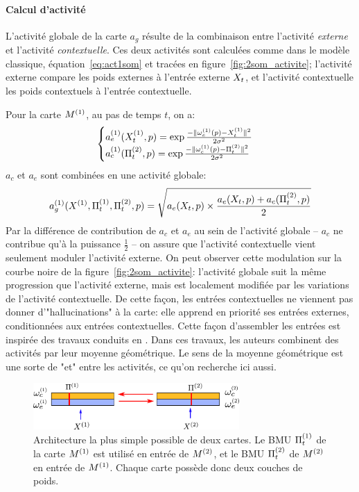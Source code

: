 \documentclass[../main]{subfiles}
\begin{document}
\paragraph{Calcul d'activité}
L'activité globale de la carte $a_g$ résulte de la combinaison entre l'activité \emph{externe} et l'activité \emph{contextuelle}. Ces deux activités sont calculées comme dans le modèle classique, équation~\ref{eq:act1som} et tracées en figure~\ref{fig:2som_activite}; l'activité externe compare les poids externes à l'entrée externe $X_t$, et l'activité contextuelle les poids contextuels à l'entrée contextuelle.

Pour la carte $M^{({1})}$, au pas de temps $t$, on a:
\begin{equation}
\label{eq:activite}
\begin{cases}
a_e^{({1})}(X_t^{({1})},p) = \exp\frac{-\lVert \omega_e^{({1})}(p)-X^{({1})}_t \rVert^2}{2\sigma^2} \\
a_c^{({1})}(\Pi^{({2})}_t,p) = \exp\frac{-\lVert \omega_c^{({1})}(p)-\Pi^{({2})}_t \rVert ^2}{2\sigma^2}\\
\end{cases}
\end{equation}
$a_c$ et $a_e$ sont combinées en une activité globale:
\begin{equation}
a_g^{({1})}(X^{({1})},\Pi^{({1})}_t,\Pi^{({2})}_t,p) = \sqrt{a_e(X_t,p)\times \frac{a_e(X_t,p) + a_c(\Pi^{({2})}_t,p)}{2}}
\end{equation}
Par la différence de contribution de $a_c$ et $a_e$ au sein de l'activité globale -- $a_c$ ne contribue qu'à la puissance $\frac{1}{2}$ -- on assure que l'activité contextuelle vient seulement moduler l'activité externe.
On peut observer cette modulation sur la courbe noire de la figure~\ref{fig:2som_activite}: l'activité globale suit la même progression que l'activité externe, mais est localement modifiée par les variations de l'activité contextuelle. De cette façon, les entrées contextuelles ne viennent pas donner d'"hallucinations" à la carte: elle apprend en priorité ses entrées externes, conditionnées aux entrées contextuelles. Cette façon d'assembler les entrées est inspirée des travaux conduits en \cite{menard_model_2005}.
Dans ces travaux, les auteurs combinent des activités par leur moyenne géométrique. 
Le sens de la moyenne géométrique est une sorte de "et" entre les activités, ce qu'on recherche ici aussi.
\begin{figure}
\centering
\includegraphics[width=0.7\textwidth]{archi_2som}
\caption{Architecture la plus simple possible de deux cartes. Le BMU $\Pi^{({1})}_t$ de la carte $M^{({1})}$ est utilisé en entrée de $M^{({2})}$, et le BMU $\Pi^{({2})}_t$ de $M^{({2})}$ en entrée de $M^{({1})}$. Chaque carte possède donc deux couches de poids. \label{fig:2som_archi}}
\end{figure}
\end{document}
